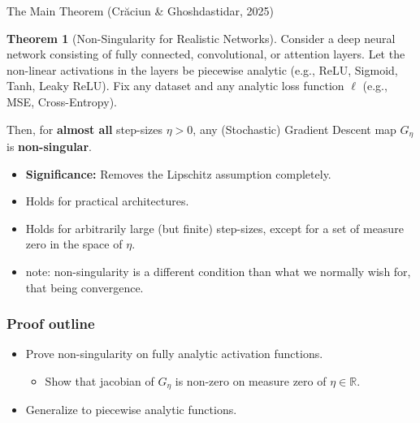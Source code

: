 \documentclass[10pt, aspectratio=169]{beamer}
\theoremstyle{definition}
\newtheorem{thm}{Theorem}
\begin{document}
\begin{frame}{The Main Theorem (Crăciun \& Ghoshdastidar, 2025)}
    \begin{thm}[Non-Singularity for Realistic Networks]
        Consider a deep neural network consisting of fully connected, convolutional, or attention layers. Let the non-linear activations in the layers be piecewise analytic (e.g., ReLU, Sigmoid, Tanh, Leaky ReLU). Fix any dataset and any analytic loss function $\ell$ (e.g., MSE, Cross-Entropy). 
        
        Then, for \textbf{almost all} step-sizes $\eta > 0$, any (Stochastic) Gradient Descent map $G_\eta$ is \textbf{non-singular}.
    \end{thm}
    \vspace{0.5cm}
    \begin{itemize}
        \item \textbf{Significance:} Removes the Lipschitz assumption completely.
        \item Holds for practical architectures.
        \item Holds for arbitrarily large (but finite) step-sizes, except for a set of measure zero in the space of $\eta$.
        \item note: non-singularity is a different condition than what we normally wish for, that being convergence.
    \end{itemize}
\end{frame}

\begin{frame}
    \frametitle{Proof outline}
    \begin{itemize}
        \item Prove non-singularity on fully analytic activation functions.
        \begin{itemize}
            \item Show that jacobian of \(G_\eta\) is non-zero on measure zero of \(\eta\in\mathbb R\). 
        \end{itemize}
        \item Generalize to piecewise analytic functions.
    \end{itemize}
    

\end{frame}
\end{document}
